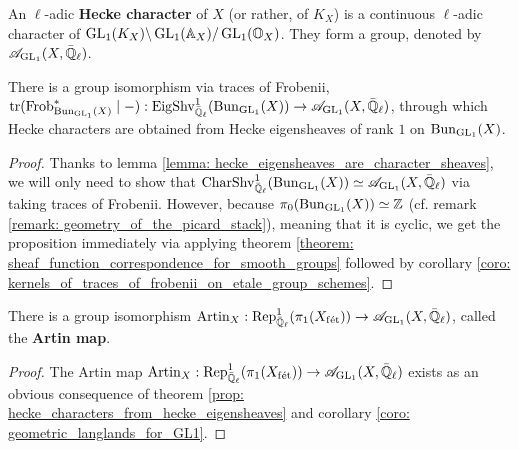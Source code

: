                 \begin{definition} \label{def: hecke_characters}
                    An $\ell$-adic \textbf{Hecke character} of $X$ (or rather, of $K_X$) is a continuous $\ell$-adic character of $\operatorname{GL}_1(K_X)\backslash\operatorname{GL}_1(\mathbb{A}_X)/\operatorname{GL}_1(\mathbb{O}_{X})$. They form a group, denoted by $\mathscr{A}_{\operatorname{GL}_1}(X, \bar{\mathbb{Q}}_{\ell})$.
                \end{definition}
                \begin{proposition} \label{prop: hecke_characters_from_hecke_eigensheaves}
                    There is a group isomorphism via traces of Frobenii, $\operatorname{tr}(\mathrm{Frob}_{\mathrm{Bun}_{\operatorname{GL}_1}(X)}^* \mid -): \mathrm{Eig}\mathrm{Shv}_{\bar{\mathbb{Q}}_{\ell}}^1(\mathrm{Bun}_{\operatorname{GL}_1}(X)) \to \mathscr{A}_{\operatorname{GL}_1}(X, \bar{\mathbb{Q}}_{\ell})$, through which Hecke characters are obtained from Hecke eigensheaves of rank $1$ on $\mathrm{Bun}_{\operatorname{GL}_1}(X)$.
                \end{proposition}
                    \begin{proof}
                        Thanks to lemma \ref{lemma: hecke_eigensheaves_are_character_sheaves}, we will only need to show that $\mathrm{Char}\mathrm{Shv}_{\bar{\mathbb{Q}}_{\ell}}^1(\mathrm{Bun}_{\operatorname{GL}_1}(X)) \simeq \mathscr{A}_{\operatorname{GL}_1}(X, \bar{\mathbb{Q}}_{\ell})$ via taking traces of Frobenii. However, because $\pi_0(\mathrm{Bun}_{\operatorname{GL}_1}(X)) \simeq \mathbb{Z}$ (cf. remark \ref{remark: geometry_of_the_picard_stack}), meaning that it is cyclic, we get the proposition immediately via applying theorem \ref{theorem: sheaf_function_correspondence_for_smooth_groups} followed by corollary \ref{coro: kernels_of_traces_of_frobenii_on_etale_group_schemes}.
                    \end{proof}
                
                \begin{theorem} \label{theorem: artin_reciprocity_for_function_fields_over_finite_fields}
                    \cite[Theorem VI.5.5]{neukirch_2010_algebraic_number_theory} There is a group isomorphism $\mathrm{Artin}_X: \mathrm{Rep}^1_{\bar{\mathbb{Q}}_{\ell}}(\pi_1(X_{\mathrm{f\acute{e}t}})) \to \mathscr{A}_{\operatorname{GL}_1}(X, \bar{\mathbb{Q}}_{\ell})$, called the \textbf{Artin map}.
                \end{theorem}
                    \begin{proof}
                        The Artin map $\mathrm{Artin}_X: \mathrm{Rep}^1_{\bar{\mathbb{Q}}_{\ell}}(\pi_1(X_{\mathrm{f\acute{e}t}})) \to \mathscr{A}_{\operatorname{GL}_1}(X, \bar{\mathbb{Q}}_{\ell})$ exists as an obvious consequence of theorem \ref{prop: hecke_characters_from_hecke_eigensheaves} and corollary \ref{coro: geometric_langlands_for_GL1}. 
                    \end{proof}
                    
